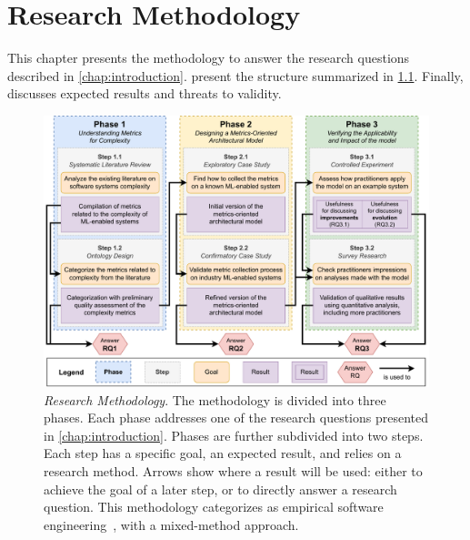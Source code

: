
\chapter{Research Methodology}
\label{chap:research_methodology}

  This chapter presents the methodology to answer the research questions
  described in \cref{chap:introduction}.
  present the structure summarized in \cref{fig:research_methodology}.
  Finally,  discusses expected results
  and threats to validity.

  \begin{figure}[hb!]
    \centering
    \includegraphics[width=\linewidth]{figures/Methodology.pdf}
    \caption[%
      Research Methodology%
    ]{%
      \emph{Research Methodology}.
      The methodology is divided into three phases. Each phase addresses one
      of the research questions presented in \cref{chap:introduction}. Phases
      are further subdivided into two steps. Each step has a specific goal,
      an expected result, and relies on a research method. Arrows show where
      a result will be used: either to achieve the goal of a later step, or
      to directly answer a research question. This methodology categorizes
      as empirical software engineering~\parencite{Shull2008GuideEngineering},
      with a mixed-method approach.
    }
    \label{fig:research_methodology}
  \end{figure}

